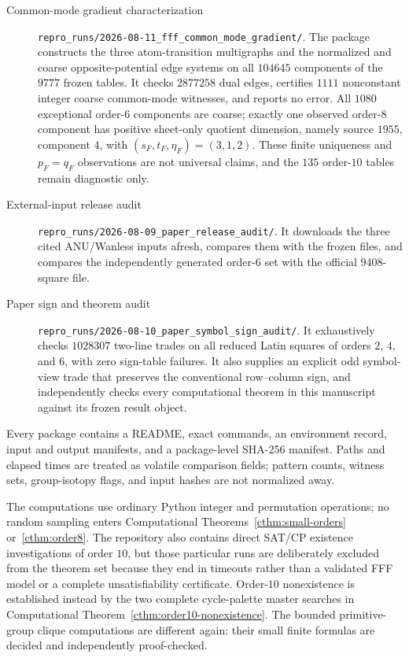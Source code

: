 \begin{description}
\item[Common-mode gradient characterization]
\nolinkurl{repro_runs/2026-08-11_fff_common_mode_gradient/}.
The package constructs the three atom-transition multigraphs and the
normalized and coarse opposite-potential edge systems on all $104645$
components of the $9777$ frozen tables.  It checks $2877258$ dual edges,
certifies $1111$ nonconstant integer coarse common-mode witnesses, and
reports no error.  All $1080$ exceptional order-$6$ components are coarse;
exactly one observed order-$8$ component has positive sheet-only quotient
dimension, namely source $1955$, component $4$, with $(s_F,t_F,\eta_F)=(3,1,2)$.
These finite uniqueness and $p_F=q_F$ observations are not universal claims,
and the $135$ order-$10$ tables remain diagnostic only.

\item[External-input release audit]
\nolinkurl{repro_runs/2026-08-09_paper_release_audit/}.
It downloads the three cited ANU/Wanless inputs afresh, compares them with the
frozen files, and compares the independently generated order-$6$ set with the
official $9408$-square file.

\item[Paper sign and theorem audit]
\nolinkurl{repro_runs/2026-08-10_paper_symbol_sign_audit/}.
It exhaustively checks $1028307$ two-line trades on all reduced Latin squares
of orders $2$, $4$, and $6$, with zero sign-table failures.  It also supplies
an explicit odd symbol-view trade that preserves the conventional
row--column sign, and independently checks every computational theorem in
this manuscript against its frozen result object.
\end{description}

Every package contains a README, exact commands, an environment record, input
and output manifests, and a package-level SHA-256 manifest.  Paths and elapsed
times are treated as volatile comparison fields; pattern counts, witness
sets, group-isotopy flags, and input hashes are not normalized away.

The computations use ordinary Python integer and permutation operations; no
random sampling enters Computational Theorems~\ref{cthm:small-orders}
or~\ref{cthm:order8}.  The repository also contains direct SAT/CP existence
investigations of order $10$, but those particular runs are deliberately
excluded from the theorem set because they end in timeouts rather than a
validated FFF model or a complete unsatisfiability certificate.  Order-$10$
nonexistence is established instead by the two complete cycle-palette master
searches in Computational Theorem~\ref{cthm:order10-nonexistence}.  The bounded
primitive-group clique computations are different again: their small finite
formulas are decided and independently proof-checked.


